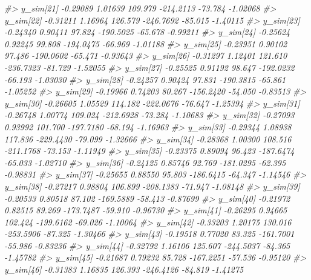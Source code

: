 \documentclass[
  10pt,
  italian,
  a4paper,
  extrafontsizes,onecolumn,openright
  ]{memoir}
\newenvironment{Shaded}{\begin{snugshade}}{\end{snugshade}}
\newcommand{\CommentTok}[1]{\textcolor[rgb]{0.56,0.35,0.01}{\textit{#1}}}
\begin{document}
\begin{Shaded}
\begin{Highlighting}[]
\CommentTok{\#\textgreater{} y\_sim[21]  {-}0.29089 1.01639 109.979 {-}214.2113 {-}73.784 {-}1.02068}
\CommentTok{\#\textgreater{} y\_sim[22]  {-}0.31211 1.16964 126.579 {-}246.7692 {-}85.015 {-}1.40115}
\CommentTok{\#\textgreater{} y\_sim[23]  {-}0.24340 0.90411  97.824 {-}190.5025 {-}65.678 {-}0.99211}
\CommentTok{\#\textgreater{} y\_sim[24]  {-}0.25624 0.92245  99.808 {-}194.0475 {-}66.969 {-}1.01188}
\CommentTok{\#\textgreater{} y\_sim[25]  {-}0.23951 0.90102  97.486 {-}190.0602 {-}65.471 {-}0.93643}
\CommentTok{\#\textgreater{} y\_sim[26]  {-}0.31297 1.12401 121.610 {-}236.7323 {-}81.729 {-}1.52055}
\CommentTok{\#\textgreater{} y\_sim[27]  {-}0.25525 0.91192  98.647 {-}192.0232 {-}66.193 {-}1.03030}
\CommentTok{\#\textgreater{} y\_sim[28]  {-}0.24257 0.90424  97.831 {-}190.3815 {-}65.861 {-}1.05252}
\CommentTok{\#\textgreater{} y\_sim[29]  {-}0.19966 0.74203  80.267 {-}156.2420 {-}54.050 {-}0.83513}
\CommentTok{\#\textgreater{} y\_sim[30]  {-}0.26605 1.05529 114.182 {-}222.0676 {-}76.647 {-}1.25394}
\CommentTok{\#\textgreater{} y\_sim[31]  {-}0.26748 1.00774 109.024 {-}212.6928 {-}73.284 {-}1.10683}
\CommentTok{\#\textgreater{} y\_sim[32]  {-}0.27093 0.93992 101.700 {-}197.7180 {-}68.194 {-}1.16963}
\CommentTok{\#\textgreater{} y\_sim[33]  {-}0.29344 1.08938 117.836 {-}229.4430 {-}79.099 {-}1.32666}
\CommentTok{\#\textgreater{} y\_sim[34]  {-}0.28368 1.00300 108.516 {-}211.1768 {-}73.153 {-}1.11949}
\CommentTok{\#\textgreater{} y\_sim[35]  {-}0.23375 0.89094  96.423 {-}187.6474 {-}65.033 {-}1.02710}
\CommentTok{\#\textgreater{} y\_sim[36]  {-}0.24125 0.85746  92.769 {-}181.0295 {-}62.395 {-}0.98831}
\CommentTok{\#\textgreater{} y\_sim[37]  {-}0.25655 0.88550  95.803 {-}186.6415 {-}64.347 {-}1.14546}
\CommentTok{\#\textgreater{} y\_sim[38]  {-}0.27217 0.98804 106.899 {-}208.1383 {-}71.947 {-}1.08148}
\CommentTok{\#\textgreater{} y\_sim[39]  {-}0.20533 0.80518  87.102 {-}169.5889 {-}58.413 {-}0.87699}
\CommentTok{\#\textgreater{} y\_sim[40]  {-}0.21972 0.82515  89.269 {-}173.7487 {-}59.910 {-}0.96730}
\CommentTok{\#\textgreater{} y\_sim[41]  {-}0.26295 0.94665 102.424 {-}199.6162 {-}69.026 {-}1.10064}
\CommentTok{\#\textgreater{} y\_sim[42]  {-}0.33203 1.20175 130.016 {-}253.5906 {-}87.325 {-}1.30466}
\CommentTok{\#\textgreater{} y\_sim[43]  {-}0.19518 0.77020  83.325 {-}161.7001 {-}55.986 {-}0.83236}
\CommentTok{\#\textgreater{} y\_sim[44]  {-}0.32792 1.16106 125.607 {-}244.5037 {-}84.365 {-}1.45782}
\CommentTok{\#\textgreater{} y\_sim[45]  {-}0.21687 0.79232  85.728 {-}167.2251 {-}57.536 {-}0.95120}
\CommentTok{\#\textgreater{} y\_sim[46]  {-}0.31383 1.16835 126.393 {-}246.4126 {-}84.819 {-}1.41275}

\end{Highlighting}
\end{Shaded}
\end{document}
